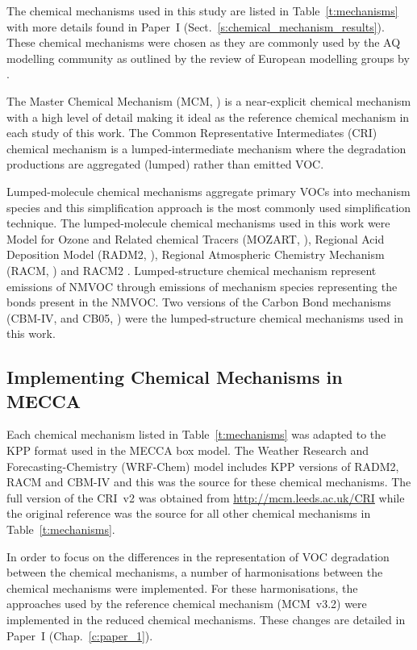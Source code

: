 The chemical mechanisms used in this study are listed in Table~\ref{t:mechanisms} with more details found in Paper~I (Sect.~\ref{s:chemical_mechanism_results}).
These chemical mechanisms were chosen as they are commonly used by the AQ modelling community as outlined by the review of European modelling groups by \citet{Baklanov:2014}.

The Master Chemical Mechanism (MCM, \citet{Jenkin:1997, Jenkin:2003, Saunders:2003, Bloss:2005, MCM_Site}) is a near-explicit chemical mechanism with a high level of detail making it ideal as the reference chemical mechanism in each study of this work.
The Common Representative Intermediates (CRI) chemical mechanism \citep{Jenkin:2008} is a lumped-intermediate mechanism where the degradation productions are aggregated (lumped) rather than emitted VOC.

Lumped-molecule chemical mechanisms aggregate primary VOCs into mechanism species and this simplification approach is the most commonly used simplification technique.
The lumped-molecule chemical mechanisms used in this work were Model for Ozone and Related chemical Tracers (MOZART, \citet{Emmons:2010}), Regional Acid Deposition Model (RADM2, \citet{Stockwell:1990}), Regional Atmospheric Chemistry Mechanism (RACM, \citet{Stockwell:1997}) and RACM2 \citet{Goliff:2013}.
Lumped-structure chemical mechanism represent emissions of NMVOC through emissions of mechanism species representing the bonds present in the NMVOC.
Two versions of the Carbon Bond mechanisms (CBM-IV, \citep{Gery:1989} and CB05, \citep{Yarwood:2005}) were the lumped-structure chemical mechanisms used in this work.

\newpage
\subsection{Implementing Chemical Mechanisms in MECCA} \label{s:mechanisms_MECCA}
Each chemical mechanism listed in Table~\ref{t:mechanisms} was adapted to the KPP format used in the MECCA box model.
The Weather Research and Forecasting-Chemistry (WRF-Chem) model \citep{Grell:2005} includes KPP versions of RADM2, RACM and CBM-IV and this was the source for these chemical mechanisms.
The full version of the CRI~v2 was obtained from \mbox{\url{http://mcm.leeds.ac.uk/CRI}} while the original reference was the source for all other chemical mechanisms in Table~\ref{t:mechanisms}.

In order to focus on the differences in the representation of VOC degradation between the chemical mechanisms, a number of harmonisations between the chemical mechanisms were implemented.
For these harmonisations, the approaches used by the reference chemical mechanism (MCM~v3.2) were implemented in the reduced chemical mechanisms.
These changes are detailed in Paper~I (Chap.~\ref{c:paper_1}). 

